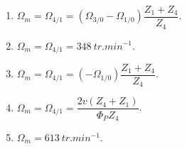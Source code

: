 %
%


\begin{enumerate}
\item $\Omega_m = \Omega_{4/1}=\left(\Omega_{3/0}-\Omega_{1/0} \right) \dfrac{Z_1 + Z_4 }{Z_4}$.
\item $\Omega_{m}=\Omega_{4/1}=\SI{348}{tr.min^{-1}}$.
\item $\Omega_m = \Omega_{4/1}=\left(-\Omega_{1/0} \right) \dfrac{Z_1 + Z_4 }{Z_4}$.
\item $\Omega_m = \Omega_{4/1}=\dfrac{2v \left(Z_4 + Z_1\right)}{\Phi_P Z_4}$.
\item $\Omega_m = \SI{613}{tr.min^{-1}}$.
\end{enumerate}
